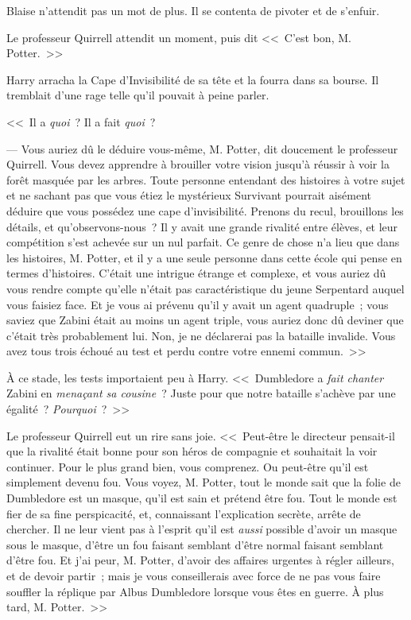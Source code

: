 Blaise n'attendit pas un mot de plus. Il se contenta de pivoter et de s'enfuir.

\later

Le professeur Quirrell attendit un moment, puis dit <<~C'est bon, M. Potter.~>>

Harry arracha la Cape d'Invisibilité de sa tête et la fourra dans sa bourse. Il tremblait d'une rage telle qu'il pouvait à peine parler.

<<~Il a \emph{quoi}~? Il a fait \emph{quoi}~?

--- Vous auriez dû le déduire vous-même, M. Potter, dit doucement le professeur Quirrell. Vous devez apprendre à brouiller votre vision jusqu'à réussir à voir la forêt masquée par les arbres. Toute personne entendant des histoires à votre sujet et ne sachant pas que vous étiez le mystérieux Survivant pourrait aisément déduire que vous possédez une cape d'invisibilité. Prenons du recul, brouillons les détails, et qu'observons-nous~? Il y avait une grande rivalité entre élèves, et leur compétition s'est achevée sur un nul parfait. Ce genre de chose n'a lieu que dans les histoires, M. Potter, et il y a une seule personne dans cette école qui pense en termes d'histoires. C'était une intrigue étrange et complexe, et vous auriez dû vous rendre compte qu'elle n'était pas caractéristique du jeune Serpentard auquel vous faisiez face. Et je vous ai prévenu qu'il y avait un agent quadruple~; vous saviez que Zabini était au moins un agent triple, vous auriez donc dû deviner que c'était très probablement lui. Non, je ne déclarerai pas la bataille invalide. Vous avez tous trois échoué au test et perdu contre votre ennemi commun.~>>

À ce stade, les tests importaient peu à Harry. <<~Dumbledore a \emph{fait chanter} Zabini en \emph{menaçant sa cousine}~? Juste pour que notre bataille s'achève par une égalité~? \emph{Pourquoi}~?~>>

Le professeur Quirrell eut un rire sans joie. <<~Peut-être le directeur pensait-il que la rivalité était bonne pour son héros de compagnie et souhaitait la voir continuer. Pour le plus grand bien, vous comprenez. Ou peut-être qu'il est simplement devenu fou. Vous voyez, M. Potter, tout le monde sait que la folie de Dumbledore est un masque, qu'il est sain et prétend être fou. Tout le monde est fier de sa fine perspicacité, et, connaissant l'explication secrète, arrête de chercher. Il ne leur vient pas à l'esprit qu'il est \emph{aussi} possible d'avoir un masque sous le masque, d'être un fou faisant semblant d'être normal faisant semblant d'être fou. Et j'ai peur, M. Potter, d'avoir des affaires urgentes à régler ailleurs, et de devoir partir~; mais je vous conseillerais avec force de ne pas vous faire souffler la réplique par Albus Dumbledore lorsque vous êtes en guerre. À plus tard, M. Potter.~>>

